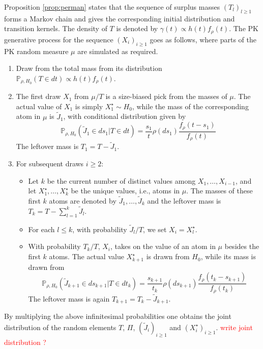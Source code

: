 Proposition \ref{prop:perman} \cite{Perman:1992ke} states that the sequence of surplus masses $(T_l)_{l \ge 1}$ forms a Markov chain and gives the corresponding initial distribution and transition kernels. The density of $T$ is denoted by $\gamma(t) \propto h(t) f_\rho(t)$. The \gls{PK} generative process for the sequence $(X_i)_{i \ge 1}$ goes as follows, where parts of the \gls{PK} random measure $\mu$ are simulated as required.

\begin{enumerate}[label=(\roman*)]
    \item Draw from the total mass from its distribution $\mathbb{P}_{\rho,H_0}(T \in dt) \propto h(t) f_\rho(t)$.
    \item The first draw $X_1$ from $\mu/T$ is a size-biased pick from the masses of $\mu$. The actual
value of $X_1$ is simply $X_1^\star \sim H_0$, while the mass of the corresponding atom in $\mu$ is
$\tilde{J}_1$, with conditional distribution given by
$$ \mathbb{P}_{\rho,H_0}(\tilde{J}_1 \in ds_1 | T \in dt) = \frac{s_1}{t}\rho(ds_1)\frac{f_\rho(t - s_1)}{f_\rho(t)} $$
The leftover mass is $T_1 = T - \tilde{J}_1$.
    \item For subsequent draws $i \ge 2:$
    \begin{itemize}
        \item Let $k$ be the current number of distinct values among $X_1,\dots,X_{i-1}$, and let
$X_1^\star,\dots,X_{k}^\star$ be the unique values, i.e., atoms in $\mu$. The masses of these first
$k$ atoms are denoted by $\tilde{J}_{1},\dots,\tilde{J}_{k}$ and the leftover mass is $T_k = T - \sum_{l=1}^k{\tilde{J}_{l}}$.
        \item For each $l \le k$, with probability $\tilde{J}_l / T$, we set $X_i = X_l^\star$.
        \item With probability $T_k / T$, $X_i$, takes on the value of an atom in $\mu$ besides the first $k$ atoms. The actual value $X_{k+1}^\star$ is drawn from $H_0$, while its mass is drawn from
        $$ \mathbb{P}_{\rho,H_0}(\tilde{J}_{k+1} \in ds_{k+1} | T \in dt_k) = \frac{s_{k+1}}{t_k}\rho(ds_{k+1})\frac{f_\rho(t_k - s_{k+1})}{f_\rho(t_k)} $$
        The leftover mass is again $T_{k+1} = T_k - \tilde{J}_{k+1}$.
    \end{itemize}
\end{enumerate}

By multiplying the above infinitesimal probabilities one obtains the joint distribution of the random elements $T$, $\Pi$, $(\tilde{J}_i)_{i \ge 1}$ and $(X_i^\star)_{i \ge 1}$.
\textcolor{red}{write joint distribution ?}

